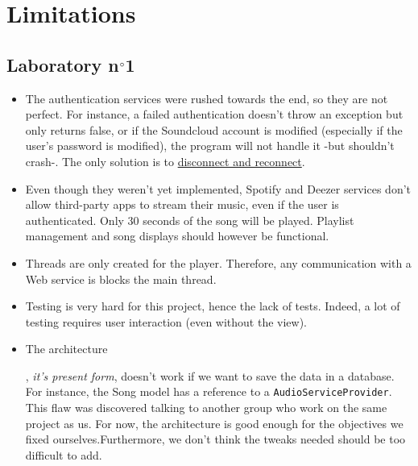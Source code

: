 \documentclass{report}
\begin{document}
\chapter{Limitations}

\section{Laboratory n$\degree$1}
\begin{itemize}
\item The authentication services were rushed towards the end, so they are not perfect. For instance, a failed authentication doesn't throw an exception but only returns false, or if the Soundcloud account is modified (especially if the user's password is modified), the program will not handle it -but shouldn't crash-. The only solution is to \href{http://img.pandawhale.com/post-16780-have-you-tried-forcing-an-unex-uQSY.gif}{disconnect and reconnect}. 
\item Even though they weren't yet implemented, Spotify and Deezer services don't allow third-party apps to stream their music, even if the user is authenticated. Only 30 seconds of the song will be played. Playlist management and song displays should however be functional.
\item Threads are only created for the player. Therefore, any communication with a Web service is blocks the main thread.
\item Testing is very hard for this project, hence the lack of tests. Indeed, a lot of testing requires user interaction (even without the view).
\item \hypertarget{db}{The architecture}, \textit{it's present form}, doesn't work if we want to save the data in a database. For instance, the Song model has a reference to a \texttt{AudioServiceProvider}. This flaw was discovered talking to another group who work on the same project as us. For now, the architecture is good enough for the objectives we fixed ourselves.Furthermore, we don't think the tweaks needed should be too difficult to add.
\end{itemize}

\end{document}
